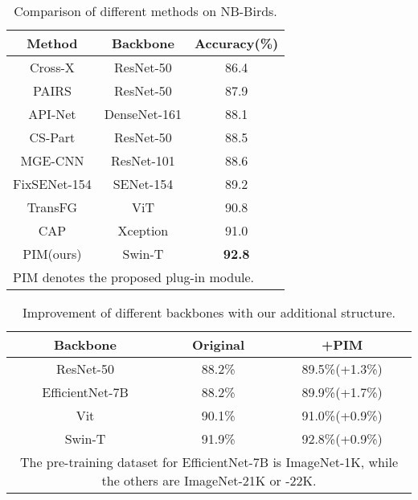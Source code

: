 \documentclass[conference]{IEEEtran}
\begin{document}
\begin{table}
\caption{Comparison of different methods on NB-Birds.}
\begin{center}
\begin{tabular}{c|c|c}
Method & Backbone & Accuracy(\%) \\
\hline
Cross-X\cite{Cross_X} & ResNet-50 & 86.4 \\
PAIRS\cite{PAIRS} & ResNet-50 & 87.9 \\
API-Net\cite{API_Net} & DenseNet-161 & 88.1 \\
CS-Part\cite{CS_PART} & ResNet-50 & 88.5 \\
MGE-CNN\cite{MGE_CNN} & ResNet-101 & 88.6 \\
FixSENet-154\cite{FixSeNet_154} & SENet-154 & 89.2 \\
TransFG\cite{TransFG} & ViT & 90.8 \\
CAP\cite{CAP} & Xception & 91.0 \\
\hline
PIM(ours) & Swin-T & \textbf{92.8} \\
\hline
\multicolumn{3}{l}{PIM denotes the proposed plug-in module.}

\end{tabular}
\label{tab2}
\end{center}
\end{table}


\begin{table}[!tp]
\caption{ Improvement of different backbones with our additional structure.}
\begin{center}
\begin{tabular}{|c|c|c|}
\hline
Backbone & Original & +PIM \\
\hline
ResNet-50 & 88.2\% & 89.5\%(+1.3\%) \\
\hline
EfficientNet-7B & 88.2\% & 89.9\%(+1.7\%) \\
\hline
Vit & 90.1\% & 91.0\%(+0.9\%) \\
\hline
Swin-T & 91.9\% & 92.8\%(+0.9\%) \\
\hline
\multicolumn{3}{p{26em}}{The pre-training dataset for EfficientNet-7B is ImageNet-1K, while the others are ImageNet-21K or -22K.}

\end{tabular}
\label{tab3}
\end{center}
\end{table}
\end{document}
